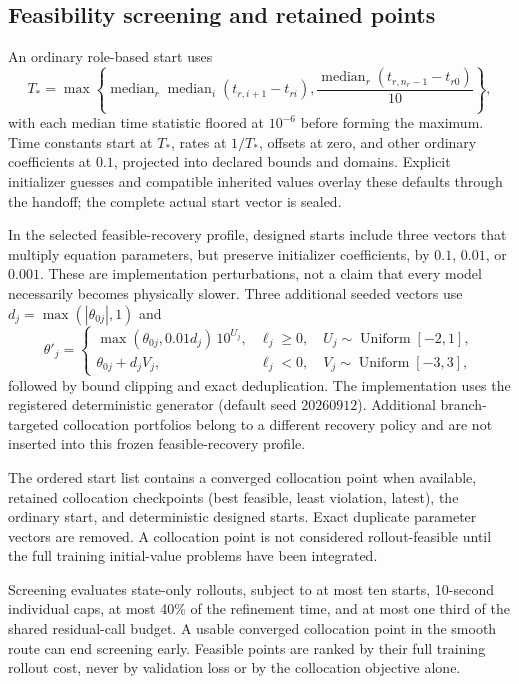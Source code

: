 \documentclass[11pt]{article}
\begin{document}
\subsection{Feasibility screening and retained points}
An ordinary role-based start uses
\begin{equation}
 T_*=\max\left\{\operatorname{median}_r
       \operatorname{median}_i(t_{r,i+1}-t_{ri}),
       \frac{\operatorname{median}_r(t_{r,n_r-1}-t_{r0})}{10}\right\},
\end{equation}
with each median time statistic floored at $10^{-6}$ before forming the maximum.
Time constants start at $T_*$, rates at $1/T_*$, offsets at zero, and other
ordinary coefficients at $0.1$, projected into declared bounds and domains.
Explicit initializer guesses and compatible inherited values overlay these
defaults through the handoff; the complete actual start vector is sealed.

In the selected feasible-recovery profile, designed starts include three vectors
that multiply equation parameters, but preserve initializer coefficients, by
$0.1$, $0.01$, or $0.001$. These are implementation perturbations, not a claim
that every model necessarily becomes physically slower. Three additional seeded
vectors use $d_j=\max(|\theta_{0j}|,1)$ and
\begin{equation}
 \theta'_j=\begin{cases}
 \max(\theta_{0j},0.01d_j)\,10^{U_j},&
       \ell_j\geq0,\quad U_j\sim\operatorname{Uniform}[-2,1],\\
 \theta_{0j}+d_jV_j,&
       \ell_j<0,\quad V_j\sim\operatorname{Uniform}[-3,3],
 \end{cases}
\end{equation}
followed by bound clipping and exact deduplication. The implementation uses the
registered deterministic generator (default seed $20260912$). Additional
branch-targeted collocation portfolios belong to a different recovery policy
and are not inserted into this frozen feasible-recovery profile.

The ordered start list contains a converged collocation point when available,
retained collocation checkpoints (best feasible, least violation, latest), the
ordinary start, and deterministic designed starts. Exact duplicate parameter
vectors are removed. A collocation point is not considered rollout-feasible
until the full training initial-value problems have been integrated.

Screening evaluates state-only rollouts, subject to at most ten starts,
10-second individual caps, at most 40\% of the refinement time, and at most
one third of the shared residual-call budget. A usable converged collocation
point in the smooth route can end screening early. Feasible points are ranked
by their full training rollout cost, never by validation loss or by the
collocation objective alone.
\end{document}
